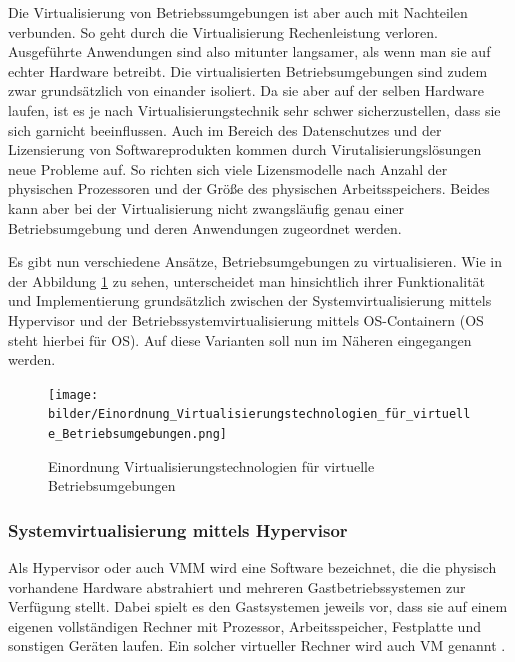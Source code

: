 Die Virtualisierung von Betriebssumgebungen ist aber auch mit Nachteilen verbunden. So geht durch die Virtualisierung Rechenleistung verloren. Ausgeführte Anwendungen sind also mitunter langsamer, als wenn man sie auf echter Hardware betreibt. Die virtualisierten Betriebsumgebungen sind zudem zwar grundsätzlich von einander isoliert. Da sie aber auf der selben Hardware laufen, ist es je nach Virtualisierungstechnik sehr schwer sicherzustellen, dass sie sich garnicht beeinflussen. Auch im Bereich des Datenschutzes und der Lizensierung von Softwareprodukten kommen durch Virutalisierungslösungen neue Probleme auf. So richten sich viele Lizensmodelle nach Anzahl der physischen Prozessoren und der Größe des physischen Arbeitsspeichers. Beides kann aber bei der Virtualisierung nicht zwangsläufig genau einer Betriebsumgebung und deren Anwendungen zugeordnet werden.

Es gibt nun verschiedene Ansätze, Betriebsumgebungen zu virtualisieren. Wie in der Abbildung \ref{einordnung} zu sehen,  unterscheidet man hinsichtlich ihrer Funktionalität und Implementierung grundsätzlich zwischen der Systemvirtualisierung mittels Hypervisor und der Betriebssystemvirtualisierung mittels OS-Containern (OS steht hierbei für \acl{OS}). Auf diese Varianten soll nun im Näheren eingegangen werden.

\begin{figure}[!ht]
  \begin{center}
    \texttt{[image: bilder/Einordnung\_Virtualisierungstechnologien\_für\_virtuelle\_Betriebsumgebungen.png]}
    \caption{Einordnung Virtualisierungstechnologien für virtuelle Betriebsumgebungen \citep{Hirschbach06}}
    \label{einordnung}
  \end{center}
\end{figure}

\subsubsection{Systemvirtualisierung mittels Hypervisor}

Als Hypervisor oder auch \ac{VMM} wird eine Software bezeichnet, die die physisch vorhandene Hardware abstrahiert und mehreren Gastbetriebssystemen zur Verfügung stellt. Dabei spielt es den Gastsystemen jeweils vor, dass sie auf einem eigenen vollständigen Rechner mit Prozessor, Arbeitsspeicher, Festplatte und sonstigen Geräten laufen. Ein solcher virtueller Rechner wird auch \ac{VM} genannt \citep[Vgl.][S. 413]{PopGol74}.

